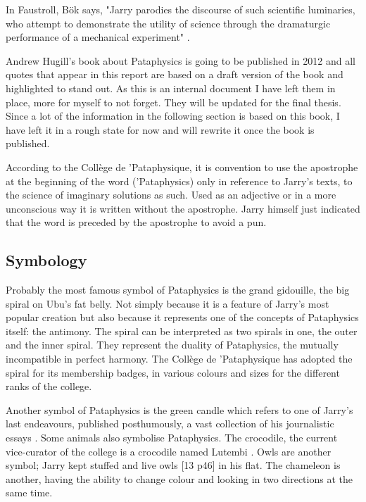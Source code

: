 In Faustroll, Bök says, "Jarry parodies the discourse of such scientific luminaries, who attempt to demonstrate the utility of science through the dramaturgic performance of a mechanical experiment" \citep[p.29]{Bok2002}.

\begin{shaded}
  Andrew Hugill's book about Pataphysics \citep{Hugill2012} is going to be published in 2012 and all quotes that appear in this report are based on a draft version of the book and highlighted to stand out. As this is an internal document I have left them in place, more for myself to not forget. They will be updated for the final thesis. Since a lot of the information in the following section is based on this book, I have left it in a rough state for now and will rewrite it once the book is published.
\end{shaded}

According to the Collège de 'Pataphysique, it is convention to use the apostrophe at the beginning of the word ('Pataphysics) only in reference to Jarry's texts, to the science of imaginary solutions as such. Used as an adjective or in a more unconscious way it is written without the apostrophe. Jarry himself just indicated that the word is preceded by the apostrophe to avoid a pun.


\subsection{Symbology}

Probably the most famous symbol of Pataphysics is the grand gidouille, the big spiral on Ubu's fat belly. Not simply because it is a feature of Jarry's most popular creation but also because it represents one of the concepts of Pataphysics itself: the antimony. The spiral can be interpreted as two spirals in one, the outer and the inner spiral. They represent the duality of Pataphysics, the mutually incompatible in perfect harmony. The Collège de 'Pataphysique has adopted the spiral for its membership badges, in various colours and sizes for the different ranks of the college.

Another symbol of Pataphysics is the green candle which refers to one of Jarry's last endeavours, published posthumously, a vast collection of his journalistic essays \citep{Hugill2012}. Some animals also symbolise Pataphysics. The crocodile, the current vice-curator of the college is a crocodile named Lutembi \citep{Hugill2012}. Owls are another symbol; Jarry kept stuffed and live owls \citep[p.46]{Brotchie2011}[13 p46] in his flat. The chameleon is another, having the ability to change colour and looking in two directions at the same time.

